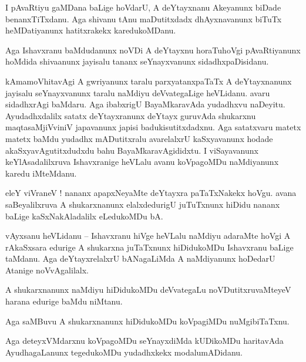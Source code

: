 \documentclass{article}
\begin{document}
\begin{mng}%
I pAvaRtiyu gaMDana baLige hoVdarU, A deYtayxnanu Akeyanunx biDade benanxTiTxdanu. Aga shivanu 
tAnu maDutitxdadx dhAyxnavanunx biTuTx heMDatiyanunx hatitxrakekx karedukoMDanu.
\end{mng}

\begin{mng}%
Aga Ishavxranu baMdudanunx noVDi A deYtayxnu horaTuhoVgi pAvaRtiyanunx hoMdida shivaanunx jayisalu 
tananx seYnayxvanunx sidadhxpaDisidanu.
\end{mng}

\begin{mng}%
kAmamoVhitavAgi A gwriyanunx taralu parxyatanxpaTaTx A deYtayxnanunx jayisalu seYnayxvanunx taralu 
naMdiyu deVvategaLige heVLidanu. avaru sidadhxrAgi baMdaru. Aga ibabxrigU BayaMkaravAda yudadhxvu 
naDeyitu. Ayudadhxdalilx satatx deYtayxranunx deYtayx guruvAda shukarxnu maqtasaMjiVviniV 
japavanunx japisi badukisutitxdadxnu. Aga satatxvaru matetx matetx baMdu yudadhx mADutitxralu 
avarelalxrU kaSxyavanunx hodade akaSxyavAgutitxdudxdu bahu BayaMkaravAgididxtu. I viSayavanunx 
keYlAsadalilxruva Ishavxranige heVLalu avanu koVpagoMDu naMdiyanunx karedu iMteMdanu.
\end{mng}

\begin{mng}%
eleY viVraneV ! nananx apapxNeyaMte deYtayxra paTaTxNakekx hoVgu. avana saBeyalilxruva A 
shukarxnanunx elalxdedurigU juTuTxnunx hiDidu nananx baLige kaSxNakAladalilx eLedukoMDu bA.
\end{mng}

\begin{mng}%
vAyxsanu heVLidanu -- Ishavxranu hiVge heVLalu naMdiyu adaraMte hoVgi A rAkaSxsara edurige A 
shukarxna juTaTxnunx hiDidukoMDu Ishavxranu baLige taMdanu. Aga deYtayxrelalxrU bANagaLiMda A 
naMdiyanunx hoDedarU Atanige noVvAgalilalx.
\end{mng}

\begin{mng}%
A shukarxnanunx naMdiyu hiDidukoMDu deVvategaLu noVDutitxruvaMteyeV harana edurige baMdu niMtanu.
\end{mng}

\begin{mng}%
Aga saMBuvu A shukarxnanunx hiDidukoMDu koVpagiMDu nuMgibiTaTxnu.
\end{mng}

\begin{mng}%
Aga deteyxVMdarxnu koVpagoMDu seYnayxdiMda kUDikoMDu haritavAda AyudhagaLanunx tegedukoMDu 
yudadhxkekx modalumADidanu.
\end{mng}
\end{document}
